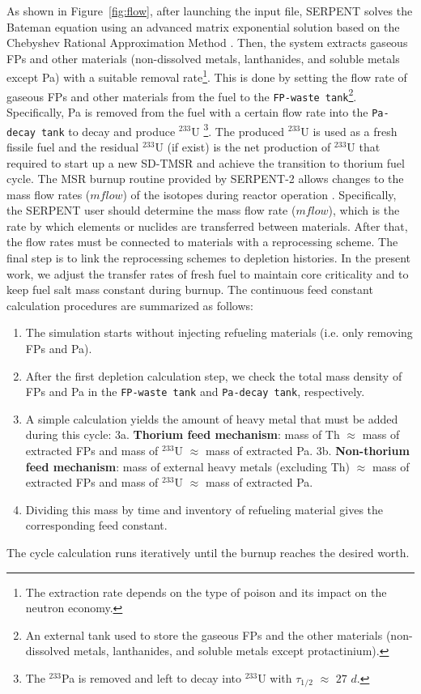 As shown in Figure~\ref{fig:flow}, after launching the input file, SERPENT solves the Bateman equation using an advanced 
matrix exponential solution based on the Chebyshev Rational Approximation 
Method \cite{isotalo2016improving}. 
Then, the system extracts gaseous \gls{FPs} and other materials 
(non-dissolved metals, lanthanides, and soluble metals except Pa) with 
a suitable removal rate\footnote{The extraction rate depends on the type of 
poison and its impact on the neutron
economy.}. This is done by setting the 
flow rate of gaseous \gls{FPs} and other materials from the fuel to the 
\texttt{FP-waste tank}\footnote{An external tank used to store the gaseous 
\gls{FPs} and the other materials (non-dissolved metals, lanthanides, and 
soluble metals except protactinium).}. Specifically, Pa is removed 
from the fuel with a certain flow rate into the 
\texttt{Pa-decay tank} to decay and produce $^{233}$U \footnote{The 
$^{233}$Pa is removed and left to decay into $^{233}$U with $\tau_{1/2}$ 
$\approx$ $27$ $d$.}. The produced $^{233}$U is used as a fresh fissile fuel 
and the residual $^{233}$U (if exist) is the net production of $^{233}$U that required to start up a new SD-TMSR and achieve the transition to thorium fuel cycle. The MSR burnup 
routine provided by SERPENT-2 allows changes to the mass flow rates ($mflow$) of the 
isotopes during reactor operation \cite{aufiero2013extended}. Specifically, the SERPENT user should determine the mass flow rate ($mflow$), which is the rate by 
which elements or nuclides are transferred between materials. After that, the 
flow rates must be connected to materials with a reprocessing scheme. 
The final step is to link the reprocessing schemes to depletion histories. In 
the present work, we adjust the transfer rates of fresh fuel to maintain core 
criticality and to keep fuel salt mass constant during burnup. The continuous feed constant calculation procedures are summarized as follows:
\begin{enumerate}
	\item The simulation starts without injecting refueling materials (i.e. only removing FPs and Pa).
	\item After the first depletion calculation step, we check the total mass density of FPs and Pa in the \texttt{FP-waste tank} and \texttt{Pa-decay tank}, respectively.
	\item A simple calculation yields the amount of heavy metal that must be added during this cycle:
	\subitem 3a. \textbf{Thorium feed mechanism}: mass of Th $\approx$ mass of extracted FPs and mass of $^{233}$U $\approx$ mass of extracted Pa.
	\subitem 3b. \textbf{Non-thorium feed mechanism}: mass of external heavy metals (excluding Th) $\approx$ mass of extracted FPs and mass of $^{233}$U $\approx$ mass of extracted Pa.
	\item Dividing this mass by time and inventory of refueling material gives the corresponding feed constant.
\end{enumerate}
The cycle calculation runs iteratively until the burnup reaches the desired worth.

